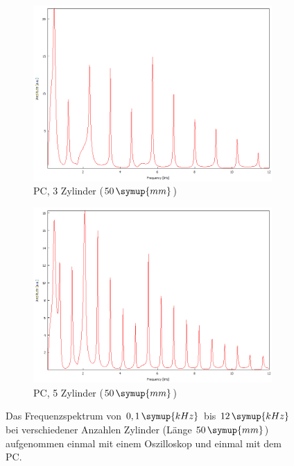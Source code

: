 \begin{figure}
\begin{subfigure}[b]{0.3\textwidth}
        \includegraphics[width=\textwidth]{data/1_2zylinder50mmPC/3.png}
        \caption{PC, 3 Zylinder ($50 \, \symup{mm}$)}
    \end{subfigure}
    \hfill
    \begin{subfigure}[b]{0.3\textwidth}
        \centering
        \includegraphics[width=\textwidth]{data/1_2zylinder50mmPC/5.png}
        \caption{PC, 5 Zylinder ($50 \, \symup{mm}$)}
    \end{subfigure}
       \caption{Das Frequenzspektrum von $0,1 \, \symup{kHz}$ bis $12 \, \symup{kHz}$ bei verschiedener Anzahlen Zylinder (Länge $50 \, \symup{mm}$) aufgenommen einmal mit einem Oszilloskop und einmal mit dem PC.}
       \label{fig:anhang1}
\end{figure}
